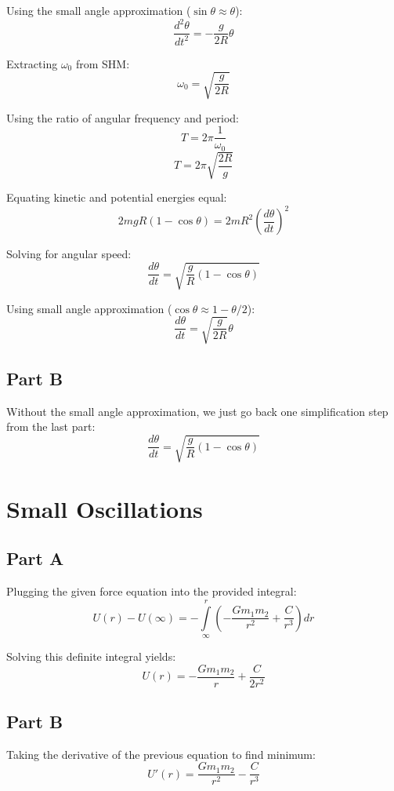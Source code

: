 \documentclass{article}
\begin{document}
Using the small angle approximation ($\sin \theta \approx \theta$):
$$ \frac{ d^{2}\theta }{ dt^{2} } = -\frac{ g }{ 2 R } \theta $$

Extracting $\omega_{0}$ from SHM:
$$ \omega_{0} = \sqrt{ \frac{ g }{ 2 R } } $$

Using the ratio of angular frequency and period:
$$ T = 2 \pi \frac{ 1 }{ \omega_{0} } $$
$$ T = 2 \pi \sqrt{ \frac{ 2 R }{ g } } $$

Equating kinetic and potential energies equal:
$$ 2 m g R ( 1 - \cos \theta ) = 2 m R^{2} \left( \frac{ d\theta }{ dt }
\right)^{2} $$

Solving for angular speed:
$$ \frac{ d\theta }{ dt } = \sqrt{ \frac{ g }{ R } ( 1 - \cos \theta ) } $$

Using small angle approximation ($\cos \theta \approx 1 - \theta / 2$):
$$ \frac{ d\theta }{ dt } = \sqrt{ \frac{ g }{ 2 R } } \theta $$

\subsection{ Part B }

Without the small angle approximation, we just go back one simplification step
from the last part:
$$ \frac{ d\theta }{ dt } = \sqrt{ \frac{ g }{ R } ( 1 - \cos \theta ) } $$

\section{ Small Oscillations }

\subsection*{ Part A }

Plugging the given force equation into the provided integral:
$$ U( r ) - U( \infty ) = - \int \limits_{\infty}^{r} \left( -\frac{ G m_{1}
m_{2} }{ r^{2} } + \frac{ C }{ r^{3} } \right) dr $$

Solving this definite integral yields:
$$ U( r ) = -\frac{ G m_{1} m_{2} }{ r } + \frac{ C }{ 2 r^{2} } $$

\subsection*{ Part B }

Taking the derivative of the previous equation to find minimum:
$$ U'( r ) = \frac{ G m_{1} m_{2} }{ r^{2} } - \frac{ C }{ r^{3} } $$
\end{document}
